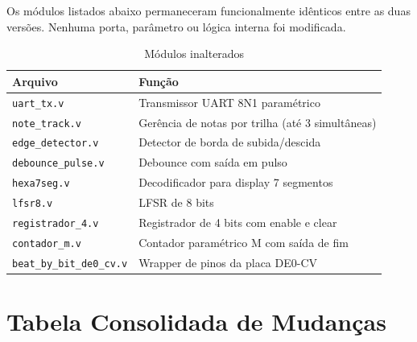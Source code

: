 \documentclass[12pt, a4paper]{article}
\begin{document}
Os módulos listados abaixo permaneceram funcionalmente idênticos entre as
duas versões. Nenhuma porta, parâmetro ou lógica interna foi modificada.

\begin{table}[h!]
\centering
\caption{Módulos inalterados}
\begin{tabular}{ll}
\toprule
\textbf{Arquivo} & \textbf{Função} \\
\midrule
\texttt{uart\_tx.v}          & Transmissor UART 8N1 paramétrico \\
\texttt{note\_track.v}       & Gerência de notas por trilha (até 3 simultâneas) \\
\texttt{edge\_detector.v}    & Detector de borda de subida/descida \\
\texttt{debounce\_pulse.v}   & Debounce com saída em pulso \\
\texttt{hexa7seg.v}          & Decodificador para display 7 segmentos \\
\texttt{lfsr8.v}             & LFSR de 8 bits \\
\texttt{registrador\_4.v}    & Registrador de 4 bits com enable e clear \\
\texttt{contador\_m.v}       & Contador paramétrico M com saída de fim \\
\texttt{beat\_by\_bit\_de0\_cv.v} & Wrapper de pinos da placa DE0-CV \\
\bottomrule
\end{tabular}
\end{table}

\section{Tabela Consolidada de Mudanças}
\end{document}
